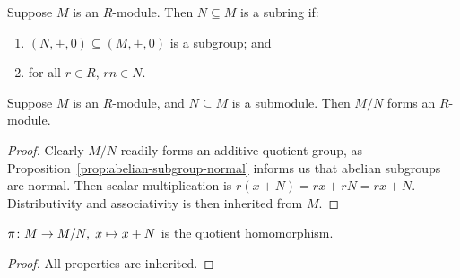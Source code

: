 
\begin{definition}
    Suppose \(M\) is an \(R\)-module.
    Then \(N \subseteq M\) is a subring if:
    \begin{enumerate}[label={(\roman*)}, itemsep=0mm]
        \item \((N,+,0) \subseteq (M,+,0)\) is a subgroup; and
        \item for all \(r \in R\), \(rn \in N\).
    \end{enumerate}
\end{definition}
\begin{lemma}
    Suppose \(M\) is an \(R\)-module,
    and \(N \subseteq M\) is a submodule.
    Then \(M/N\) forms an \(R\)-module.
\end{lemma}
\begin{proof}
    Clearly \(M/N\) readily forms an additive quotient group,
    as Proposition~\ref{prop:abelian-subgroup-normal} informs us that abelian subgroups are normal.
    Then scalar multiplication is \(r(x+N) = rx + rN = rx + N\).
    Distributivity and associativity is then inherited from \(M\).
\end{proof}
\begin{corollary}
    \(\pi\colon M\to M/N,\;x\mapsto x+N\) is the quotient homomorphism.
\end{corollary}
\begin{proof}
    All properties are inherited.
\end{proof}

